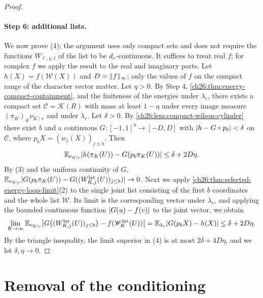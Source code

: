 \begin{proof}
\paragraph{Step 6: additional lists.}
We now prove (4); the argument uses only compact sets and does not require the functions $W_{\ell,\chi,t}$ of the list to be $d_c$-continuous. It suffices to treat real $f$; for complex $f$ we apply the result to the real and imaginary parts. Let $h(X)=f(\mathscr W(X))$ and $D=\lVert f\rVert_\infty$; only the values of $f$ on the compact range of the character vector matter. Let $\eta>0$. By Step 4, \cref{ch26:thm:energy-compact-containment}, and the finiteness of the energies under $\lambda_r$, there exists a compact set $\mathcal C=\mathcal K(R)$ with mass at least $1-\eta$ under every image measure $(\pi_K)_\#\nu_{K\mid r}$ and under $\lambda_r$. Let $\delta>0$. By \cref{ch26:lem:compact-wilson-cylinder} there exist $b$ and a continuous $G:[-1,1]^b\to[-D,D]$ with $\lvert h-G\circ p_b\rvert<\delta$ on $\mathcal C$, where $p_bX=(w_j(X))_{j\le b}$. Then
\[
 \mathbb E_{\nu_{K\mid r}}\lvert h(\pi_K(U))-G(p_b\pi_K(U))\rvert\le\delta+2D\eta .
\]
By (3) and the uniform continuity of $G$, $\mathbb E_{\nu_{K\mid r}}\lvert G(p_b\pi_K(U))-G((W^{\mathrm{lat}}_{K,j}(U))_{j\le b})\rvert\to0$. Next we apply \cref{ch26:thm:selected-energy-loop-limit}(2) to the single joint list consisting of the first $b$ coordinates and the whole list $\mathscr W$. Its limit is the corresponding vector under $\lambda_r$, and applying the bounded continuous function $\lvert G(u)-f(v)\rvert$ to the joint vector, we obtain
\[
 \lim_{K\to\infty}\mathbb E_{\nu_{K\mid r}}\bigl\lvert G\bigl((W^{\mathrm{lat}}_{K,j}(U))_{j\le b}\bigr)-f(\mathscr W^{\mathrm{lat}}_K(U))\bigr\rvert=\mathbb E_{\lambda_r}\lvert G(p_bX)-h(X)\rvert\le\delta+2D\eta .
\]
By the triangle inequality, the limit superior in (4) is at most $2\delta+4D\eta$, and we let $\delta,\eta\to0$.
\end{proof}

\section{Removal of the conditioning}\label{ch26:sec:unconditioning}


